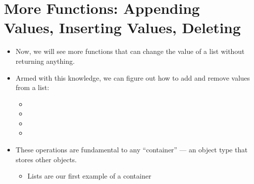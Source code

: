 \documentclass[letterpaper,10pt,english]{sphinxmanual}
\begin{document}
\section{More Functions: Appending Values, Inserting Values, Deleting}
\label{\detokenize{lecture_notes/lec08_lists1:more-functions-appending-values-inserting-values-deleting}}\begin{itemize}
\item {} 
Now, we will see more functions that can change the value of a list
without returning anything.

\item {} 
Armed with this knowledge, we can figure out how to add and remove
values from a list:
\begin{itemize}
\item {} 

\item {} 

\item {} 

\item {} 

\end{itemize}

\item {} 
These operations are fundamental to any “container” — an object type
that stores other objects.
\begin{itemize}
\item {} 
Lists are our first example of a container

\end{itemize}

\end{itemize}
\end{document}
